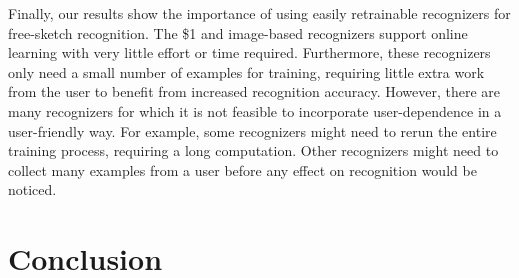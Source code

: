 \documentclass[final,5p,twocolumn]{elsarticle}
\begin{document}



Finally, our results show the importance of using easily retrainable
recognizers for free-sketch recognition.  The \$1 and image-based
recognizers support online learning with very little effort or time
required. Furthermore, these recognizers only need a small number of
examples for training, requiring little extra work from the user to
benefit from increased recognition accuracy. However, there are many
recognizers for which it is not feasible to incorporate
user-dependence in a user-friendly way. For example, some recognizers
might need to rerun the entire training process, requiring a long
computation. Other recognizers might need to collect many examples
from a user before any effect on recognition would be noticed. 




\section{Conclusion}
\end{document}
